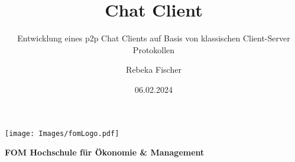 \documentclass[
    12pt,
    bibliography=totoc,
    listof=totoc
]{scrartcl}
\title{Chat Client}
\subtitle{Entwicklung eines p2p Chat Clients auf Basis von klassischen Client-Server Protokollen}
\author{Rebeka Fischer \\}
\date{06.02.2024}
\begin{document}
\onehalfspace
\makeatletter
\thispagestyle{empty}
\begin{titlepage}{

    \begin{center}
        \texttt{[image: Images/fomLogo.pdf]}

        \vspace{10mm}
        \fontsize{20pt}{20pt}\selectfont
        \textbf{FOM Hochschule für Ökonomie \& Management}\\
    \end{center}


        
}
\end{titlepage}
\end{document}
